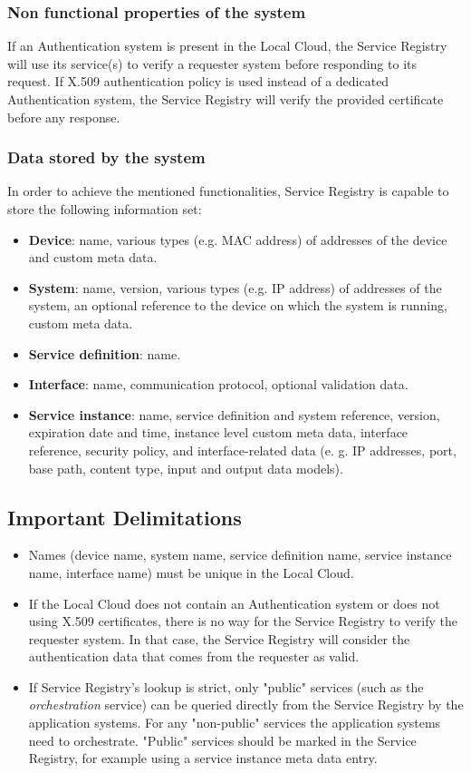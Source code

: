 \documentclass[a4paper]{arrowhead}
\begin{document}
\subsubsection {Non functional properties of the system}
If an Authentication system is present in the Local Cloud, the Service Registry will use its service(s) to verify a requester system before responding to its request. If X.509 authentication policy is used instead of a dedicated Authentication system, the Service Registry will verify the provided certificate before any response.

\subsubsection {Data stored by the system}
In order to achieve the mentioned functionalities, Service Registry is capable to store the following information set:

\begin{itemize}
    \item \textbf{Device}: name, various types (e.g. MAC address) of addresses of the device and custom meta data.
    \item \textbf{System}: name, version, various types (e.g. IP address) of addresses of the system, an optional reference to the device on which the system is running, custom meta data. 
    \item \textbf{Service definition}: name.
    \item \textbf{Interface}: name, communication protocol, optional validation data.
    \item \textbf{Service instance}: name, service definition and system reference, version, expiration date and time, instance level custom meta data, interface reference, security policy, and interface-related data (e. g. IP addresses, port, base path, content type, input and output data models).
\end{itemize}

\subsection{Important Delimitations}
\label{sec:delimitations}

\begin{itemize}
    \item Names (device name, system name, service definition name, service instance name, interface name) must be unique in the Local Cloud.
    \item If the Local Cloud does not contain an Authentication system or does not using X.509 certificates, there is no way for the Service Registry to verify the requester system. In that case, the Service Registry will consider the authentication data that comes from the requester as valid.
    \item If Service Registry's lookup is strict, only "public" services (such as the \textit{orchestration} service) can be queried directly from the Service Registry by the application systems. For any "non-public" services the application systems need to orchestrate. "Public" services should be marked in the Service Registry, for example using a service instance meta data entry.
\end{itemize}
\end{document}
